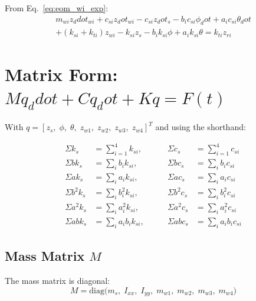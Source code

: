 \documentclass[11pt]{article}
\def\vect#1{#1}%
\def\ddot#1{#1_ddot}%
\def\dot#1{#1_dot}%
\newcommand{\vect}[1]{\bm{#1}}
\begin{document}
From Eq.~\eqref{eq:eom_wi_exp}:
\begin{multline}
m_{wi}\ddot{z}_{wi} + c_{si}\dot{z}_{wi} - c_{si}\dot{z}_s - b_i c_{si}\dot\phi + a_i c_{si}\dot\theta \\
+ (k_{si}+k_{ti})z_{wi} - k_{si}z_s - b_i k_{si}\phi + a_i k_{si}\theta = k_{ti}z_{ri}
\label{eq:wheel_full}
\end{multline}

\section[Matrix Form]{Matrix Form: \texorpdfstring{$\vect{M}\ddot{\vect{q}} + \vect{C}\dot{\vect{q}} + \vect{K}\vect{q} = \vect{F}(t)$}{M q\_ddot + C q\_dot + K q = F(t)}}

With $\vect{q} = [z_s,\;\phi,\;\theta,\;z_{w1},\;z_{w2},\;z_{w3},\;z_{w4}]^T$ and using the shorthand:

\begin{equation}
\begin{aligned}
\Sigma k_s &= \sum_{i=1}^4 k_{si}, \qquad &\Sigma c_s &= \sum_{i=1}^4 c_{si} \\
\Sigma b k_s &= \sum_i b_i k_{si}, \qquad &\Sigma b c_s &= \sum_i b_i c_{si} \\
\Sigma a k_s &= \sum_i a_i k_{si}, \qquad &\Sigma a c_s &= \sum_i a_i c_{si} \\
\Sigma b^2 k_s &= \sum_i b_i^2 k_{si}, \qquad &\Sigma b^2 c_s &= \sum_i b_i^2 c_{si} \\
\Sigma a^2 k_s &= \sum_i a_i^2 k_{si}, \qquad &\Sigma a^2 c_s &= \sum_i a_i^2 c_{si} \\
\Sigma ab k_s &= \sum_i a_i b_i k_{si}, \qquad &\Sigma ab c_s &= \sum_i a_i b_i c_{si}
\end{aligned}
\end{equation}

\subsection{Mass Matrix $\vect{M}$}

The mass matrix is diagonal:
\begin{equation}
\boxed{
\vect{M} = \mathrm{diag}\bigl(m_s,\; I_{xx},\; I_{yy},\; m_{w1},\; m_{w2},\; m_{w3},\; m_{w4}\bigr)
}
\label{eq:M}
\end{equation}
\end{document}
